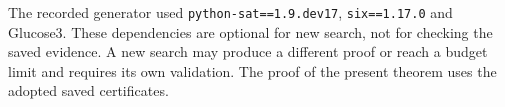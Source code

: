 The recorded generator used \texttt{python-sat==1.9.dev17},
\texttt{six==1.17.0} and Glucose3. These dependencies are optional for
new search, not for checking the saved evidence. A new search may produce
a different proof or reach a budget limit and requires its own validation.
The proof of the present theorem uses the adopted saved certificates.

